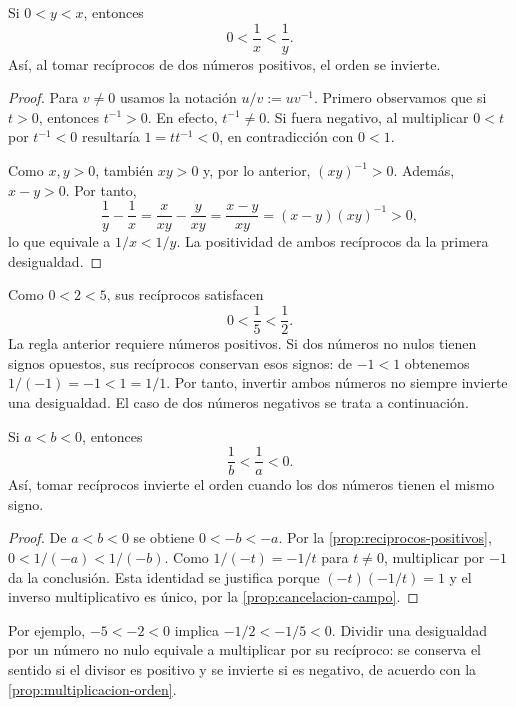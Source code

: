 \begin{samepage}
\begin{proposition}
\label{prop:reciprocos-positivos}
Si $0<y<x$, entonces
\[
0<\frac1x<\frac1y.
\]
Así, al tomar recíprocos de dos números positivos, el orden se invierte.
\end{proposition}
\end{samepage}

\begin{proof}
Para $v\ne0$ usamos la notación $u/v:=uv^{-1}$. Primero observamos que si $t>0$, entonces $t^{-1}>0$. En efecto, $t^{-1}\ne0$. Si fuera negativo, al multiplicar $0<t$ por $t^{-1}<0$ resultaría $1=tt^{-1}<0$, en contradicción con $0<1$.

Como $x,y>0$, también $xy>0$ y, por lo anterior, $(xy)^{-1}>0$. Además, $x-y>0$. Por tanto,
\[
\frac1y-\frac1x
=\frac{x}{xy}-\frac{y}{xy}
=\frac{x-y}{xy}
=(x-y)(xy)^{-1}>0,
\]
lo que equivale a $1/x<1/y$. La positividad de ambos recíprocos da la primera desigualdad.
\end{proof}

\begin{example}
Como $0<2<5$, sus recíprocos satisfacen
\[
0<\frac15<\frac12.
\]
La regla anterior requiere números positivos. Si dos números no nulos tienen signos opuestos, sus recíprocos conservan esos signos: de $-1<1$ obtenemos $1/(-1)=-1<1=1/1$. Por tanto, invertir ambos números no siempre invierte una desigualdad. El caso de dos números negativos se trata a continuación.
\end{example}

\begin{samepage}
\begin{corollary}
\label{cor:reciprocos-negativos}
Si $a<b<0$, entonces
\[
\frac1b<\frac1a<0.
\]
Así, tomar recíprocos invierte el orden cuando los dos números tienen el mismo signo.
\end{corollary}
\end{samepage}

\begin{proof}
De $a<b<0$ se obtiene $0<-b<-a$. Por la \cref{prop:reciprocos-positivos},
$0<1/(-a)<1/(-b)$. Como $1/(-t)=-1/t$ para $t\neq0$, multiplicar por $-1$ da la conclusión. Esta identidad se justifica porque $(-t)(-1/t)=1$ y el inverso multiplicativo es único, por la \cref{prop:cancelacion-campo}.
\end{proof}

Por ejemplo, $-5<-2<0$ implica $-1/2<-1/5<0$. Dividir una desigualdad por un número no nulo equivale a multiplicar por su recíproco: se conserva el sentido si el divisor es positivo y se invierte si es negativo, de acuerdo con la \cref{prop:multiplicacion-orden}.

